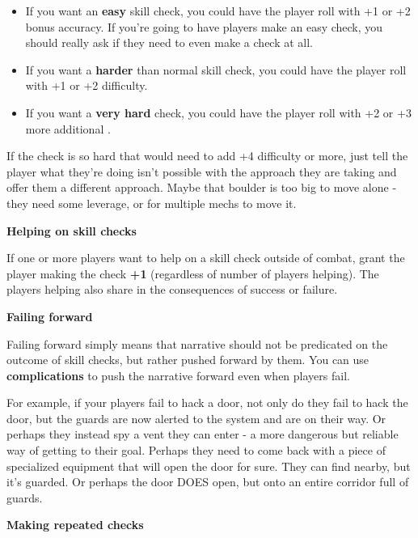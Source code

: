 \begin{itemize}
\item If you want an \textbf{easy} skill check, you could have the player roll with +1 or +2 bonus accuracy. If
you’re going to have players make an easy check, you should really ask if they need to even
make a check at all.

\item If you want a \textbf{harder} than normal skill check, you could have the player roll with +1 or +2
difficulty.

\item If you want a \textbf{very hard} check, you could have the player roll with +2 or +3 more additional
\Difficulty.
\end{itemize}

If the check is so hard that would need to add +4 difficulty or more, just tell the player what
they’re doing isn’t possible with the approach they are taking and offer them a different
approach. Maybe that boulder is too big to move alone - they need some leverage, or for
multiple mechs to move it.

\begin{center}
\textbf{Helping on skill checks}
\end{center}

If one or more players want to help on a skill check outside of combat, grant the player making
the check \textbf{+1 \Accuracy} (regardless of number of players helping). The players helping also share
in the consequences of success or failure.

\begin{center}
\textbf{Failing forward}
\end{center}

Failing forward simply means that narrative should not be predicated on the outcome of skill
checks, but rather pushed forward by them. You can use \textbf{complications} to push the narrative
forward even when players fail.

For example, if your players fail to hack a door, not only do they fail to hack the door, but the
guards are now alerted to the system and are on their way. Or perhaps they instead spy a vent
they can enter - a more dangerous but reliable way of getting to their goal. Perhaps they need to
come back with a piece of specialized equipment that will open the door for sure. They can find
nearby, but it’s guarded. Or perhaps the door DOES open, but onto an entire corridor full of
guards.

\begin{center}
\textbf{Making repeated checks}
\end{center}

